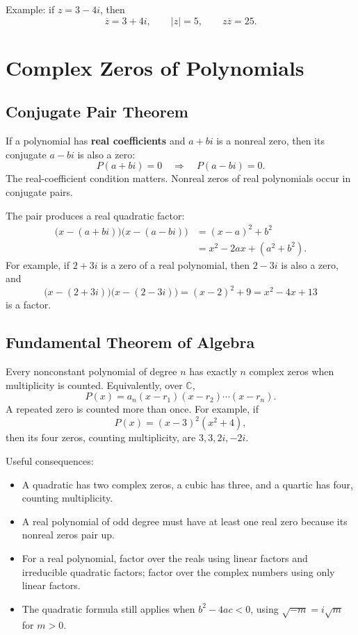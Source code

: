 \documentclass[12pt]{article}
\begin{document}
Example: if $z=3-4i$, then
\[
  \overline z=3+4i,
  \qquad |z|=5,
  \qquad z\overline z=25.
\]

\section*{Complex Zeros of Polynomials}
\subsection*{Conjugate Pair Theorem}
If a polynomial has \textbf{real coefficients} and $a+bi$ is a nonreal zero, then its conjugate $a-bi$ is also a zero:
\[
  P(a+bi)=0 \quad\Longrightarrow\quad P(a-bi)=0.
\]
The real-coefficient condition matters. Nonreal zeros of real polynomials occur in conjugate pairs.

The pair produces a real quadratic factor:
\[
\begin{aligned}
  \bigl(x-(a+bi)\bigr)\bigl(x-(a-bi)\bigr)
  &=(x-a)^2+b^2\\
  &=x^2-2ax+(a^2+b^2).
\end{aligned}
\]
For example, if $2+3i$ is a zero of a real polynomial, then $2-3i$ is also a zero, and
\[
  \bigl(x-(2+3i)\bigr)\bigl(x-(2-3i)\bigr)
  =(x-2)^2+9=x^2-4x+13
\]
is a factor.

\subsection*{Fundamental Theorem of Algebra}
Every nonconstant polynomial of degree $n$ has exactly $n$ complex zeros when multiplicity is counted. Equivalently, over $\mathbb C$,
\[
  P(x)=a_n(x-r_1)(x-r_2)\cdots(x-r_n).
\]
A repeated zero is counted more than once. For example, if
\[
  P(x)=(x-3)^2(x^2+4),
\]
then its four zeros, counting multiplicity, are $3,3,2i,-2i$.

Useful consequences:
\begin{itemize}[leftmargin=1.5em,itemsep=0.2em]
  \item A quadratic has two complex zeros, a cubic has three, and a quartic has four, counting multiplicity.
  \item A real polynomial of odd degree must have at least one real zero because its nonreal zeros pair up.
  \item For a real polynomial, factor over the reals using linear factors and irreducible quadratic factors; factor over the complex numbers using only linear factors.
  \item The quadratic formula still applies when $b^2-4ac<0$, using $\sqrt{-m}=i\sqrt m$ for $m>0$.
\end{itemize}
\end{document}
